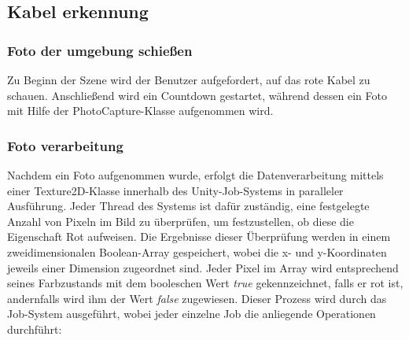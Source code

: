\subsection{Kabel erkennung}
\subsubsection{Foto der umgebung schießen}
Zu Beginn der Szene wird der Benutzer aufgefordert, auf das rote Kabel zu schauen. Anschließend wird ein Countdown
gestartet, während dessen ein Foto mit Hilfe der PhotoCapture-Klasse aufgenommen wird.

\subsubsection{Foto verarbeitung}
Nachdem ein Foto aufgenommen wurde, erfolgt die Datenverarbeitung mittels einer Texture2D-Klasse innerhalb des
Unity-Job-Systems in paralleler Ausführung. Jeder Thread des Systems ist dafür zuständig, eine festgelegte Anzahl von
Pixeln im Bild zu überprüfen, um festzustellen, ob diese die Eigenschaft Rot aufweisen. Die Ergebnisse dieser
Überprüfung werden in einem zweidimensionalen Boolean-Array gespeichert, wobei die x- und y-Koordinaten jeweils einer
Dimension zugeordnet sind. Jeder Pixel im Array wird entsprechend seines Farbzustands mit dem booleschen Wert
\textit{true} gekennzeichnet, falls er rot ist, andernfalls wird ihm der Wert \textit{false} zugewiesen. Dieser Prozess
wird durch das Job-System ausgeführt, wobei jeder einzelne Job die anliegende Operationen durchführt:

